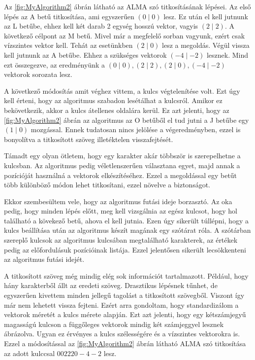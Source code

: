 \documentclass[12pt]{report} %
\begin{document}
Az \ref{fig:MyAlgorithm2} ábrán látható az ALMA szó titkosításának lépései. Az első lépés az A betű titkosítása, ami egyszerűen $(0 \mid 0)$ lesz. Ez után el kell jutnunk az L betűbe, ehhez kell két darab 2 egység hosszú vektor, vagyis $(2 \mid 2)$. A következő célpont az M betű. Mivel már a megfelelő sorban vagyunk, ezért csak vízszintes vektor kell. Tehát az esetünkben $(2 \mid 0)$ lesz a megoldás. Végül vissza kell jutnunk az A betűbe. Ehhez a szükséges vektorok $(-4 \mid -2)$ lesznek. Mind ezt összegezve, az eredményünk a $(0 \mid 0), (2 \mid 2), (2 \mid 0), (-4 \mid -2)$ vektorok sorozata lesz.

A következő módosítás amit véghez vittem, a kulcs végtelenítése volt. Ezt úgy kell érteni, hogy az algoritmus szabadon lesétálhat a kulcsról. Amikor ez bekövetkezik, akkor a kulcs átellenes oldalára kerül. Ez azt jelenti, hogy az \ref{fig:MyAlgorithm2} ábrán az algoritmus az O betűből el tud jutni a J betűbe egy $(1 \mid 0)$ mozgással. Ennek tudatosan nincs jelölése a végeredményben, ezzel is bonyolítva a titkosított szöveg illetéktelen visszafejtését.

Támadt egy olyan ötletem, hogy egy karakter akár többször is szerepelhetne a kulcsban. Az algoritmus pedig véletlenszerűen választana egyet, majd annak a pozícióját használná a vektorok elkészítéséhez. Ezzel a megoldással egy betűt több különböző módon lehet titkosítani, ezzel növelve a biztonságot.

Ekkor szembesültem vele, hogy az algoritmus futási ideje borzasztó. Az oka pedig, hogy minden lépés előtt, meg kell vizsgálnia az egész kulcsot, hogy hol található a kövekező betű, ahova el kell jutnia. Ezen úgy sikerült túllépni, hogy a kulcs beállítása után az algoritmus készít magának egy szótárat róla. A szótárban szereplő kulcsok az algoritmus kulcsában megtalálható karakterek, az értékek pedig az előfordulásuk pozícióinak listája. Ezzel jelentősen sikerült lecsökkenteni az algoritmus futási idejét.

A titkosított szöveg még mindig elég sok információt tartalmazott. Például, hogy hány karakterből állt az eredeti szöveg. Drasztikus lépésnek tűnhet, de egyszerűen kivettem minden jellegű tagolást a titkosított szövegből. Viszont így már nem lehetett vissza fejteni. Ezért arra gondoltam, hogy standardizálom a vektorok méretét a kulcs mérete alapján. Ezt azt jelenti, hogy egy kétszámjegyű magasságú kulcson a függőleges vektorok mindig két számjeggyel lesznek ábrázolva. Ugyan ez érvényes a kulcs szélességére és a vízszintes vektorokra is. Ezzel a módosítással az \ref{fig:MyAlgorithm2} ábrán látható ALMA szó titkosítása az adott kulccsal $002220-4-2$ lesz.
\end{document}
